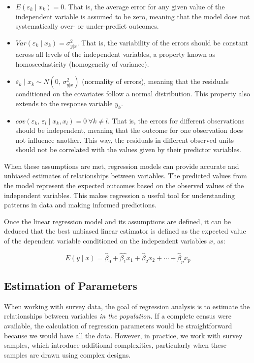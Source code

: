 \documentclass[
  12pt,
]{book}
\begin{document}
\begin{itemize}
\item
  \(E\left(\varepsilon_{k}\mid x_{k}\right) = 0\). That is, the average error for any given value of the independent variable is assumed to be zero, meaning that the model does not systematically over- or under-predict outcomes.
\item
  \(Var\left(\varepsilon_{k}\mid x_{k}\right)=\sigma_{y|x}^{2}\). That is, the variability of the errors should be constant across all levels of the independent variables, a property known as homoscedasticity (homogeneity of variance).
\item
  \(\varepsilon_{k}\mid x_{k}\sim N\left(0,\,\sigma_{y|x}^{2}\right)\) (normality of errors), meaning that the residuals conditioned on the covariates follow a normal distribution. This property also extends to the response variable \(y_{k}\).
\item
  \(cov\left(\varepsilon_{k},\,\varepsilon_{l}\mid x_{k},x_{l}\right) = 0 \ \forall k \neq l\). That is, the errors for different observations should be independent, meaning that the outcome for one observation does not influence another. This way, the residuals in different observed units should not be correlated with the values given by their predictor variables.
\end{itemize}

When these assumptions are met, regression models can provide accurate and unbiased estimates of relationships between variables. The predicted values from the model represent the expected outcomes based on the observed values of the independent variables. This makes regression a useful tool for understanding patterns in data and making informed predictions.

Once the linear regression model and its assumptions are defined, it can be deduced that the best unbiased linear estimator is defined as the expected value of the dependent variable conditioned on the independent variables \(x\), as:

\[
E\left( y \mid x \right) = \hat{\beta}_{0} + \hat{\beta_{1}} x_{1} + \hat{\beta}_{2} x_{2} + \cdots + \hat{\beta}_{p} x_{p}
\]

\hypertarget{estimation-of-parameters}{%
\subsection{Estimation of Parameters}\label{estimation-of-parameters}}

When working with survey data, the goal of regression analysis is to estimate the relationships between variables \emph{in the population}. If a complete census were available, the calculation of regression parameters would be straightforward because we would have all the data. However, in practice, we work with survey samples, which introduce additional complexities, particularly when these samples are drawn using complex designs.
\end{document}
